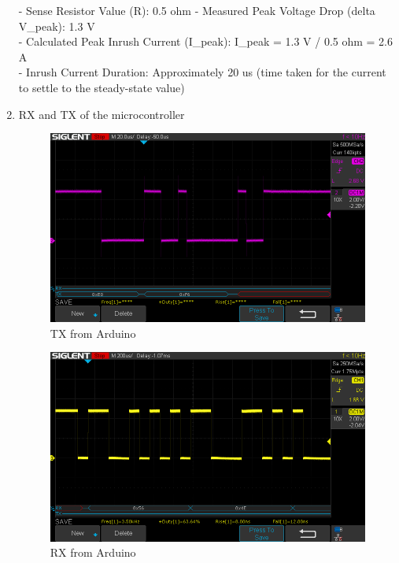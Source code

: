 \documentclass[a4paper,11pt]{article}%
\begin{document}
\begin{enumerate}
		- Sense Resistor Value (R): 0.5 ohm - Measured Peak Voltage Drop (delta V\_peak): 1.3 V \\
		- Calculated Peak Inrush Current (I\_peak): I\_peak = 1.3 V / 0.5 ohm = 2.6 A \\
		- Inrush Current Duration: Approximately 20 us (time taken for the current to settle to the steady-state value)\\
		\item 
		RX and TX of the microcontroller
		\begin{figure}[H]
			\centering
			\includegraphics[scale=0.6]{figures/TX_of_ARDUINO.png}
			\caption{TX from Arduino}
		\end{figure}

		\begin{figure}[H]
			\centering
			\includegraphics[scale=0.6]{figures/RX_of_ARDUINO.png}
			\caption{RX from Arduino}
		\end{figure}
		

\end{enumerate}
\end{document}
